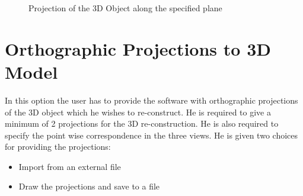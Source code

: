 \documentclass[a4paper,12pt,openany]{report}
\begin{document}
\begin{figure}[h]
	\centering
	\caption{Projection of the 3D Object along the specified plane}
\end{figure}

\chapter*{Orthographic Projections to 3D Model}
In this option the user has to provide the software with orthographic projections of the 3D object which he wishes to re-construct. He is required to give a minimum of 2 projections for the 3D re-construction. He is also required to specify the point wise correspondence in the three views. He is given two choices for providing the projections:
\begin{itemize}
  \item Import from an external file
  \item Draw the projections and save to a file
\end{itemize}
\end{document}
